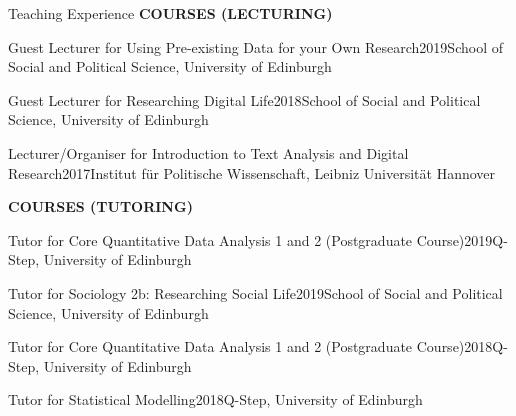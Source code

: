 \documentclass{resume} %
\begin{document}
\begin{rSection}{Teaching Experience}
{\bf COURSES (LECTURING)} \hfill 

\begin{rSubsectionTeaching}{Guest Lecturer for Using Pre-existing Data for your Own Research}{2019}{School of Social and Political Science, University of Edinburgh}{}
\end{rSubsectionTeaching}

\begin{rSubsectionTeaching}{Guest Lecturer for Researching Digital Life}{2018}{School of Social and Political Science, University of Edinburgh}{}
\end{rSubsectionTeaching}

\begin{rSubsectionTeaching}{Lecturer/Organiser  for Introduction to Text Analysis and Digital Research}{2017}{Institut für Politische Wissenschaft, Leibniz Universität Hannover}{}
\end{rSubsectionTeaching}





{\bf COURSES (TUTORING)} \hfill 


\begin{rSubsectionTeaching}{Tutor for Core Quantitative Data Analysis 1 and 2 (Postgraduate Course)}{2019}{Q-Step, University of Edinburgh}{}
\end{rSubsectionTeaching}

\begin{rSubsectionTeaching}{Tutor for Sociology 2b: Researching Social Life}{2019}{School of Social and Political Science, University of Edinburgh}{}
\end{rSubsectionTeaching}

\begin{rSubsectionTeaching}{Tutor for Core Quantitative Data Analysis 1 and 2 (Postgraduate Course)}{2018}{Q-Step, University of Edinburgh}{}
\end{rSubsectionTeaching}

\begin{rSubsectionTeaching}{Tutor for Statistical Modelling}{2018}{Q-Step, University of Edinburgh}{}
\end{rSubsectionTeaching}


\end{rSection}
\end{document}
